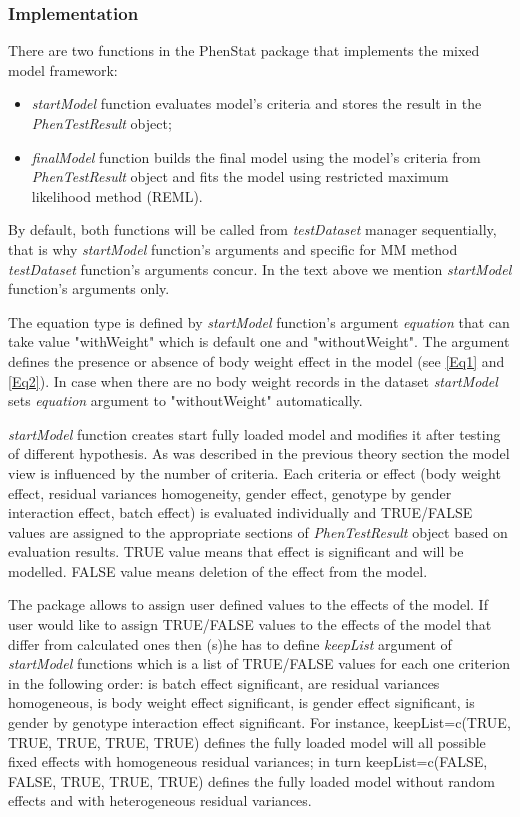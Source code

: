 \documentclass[12pt,a4paper]{article}
\begin{document}
\subsubsection{Implementation}
\label{sec:MMImplementation}
There are two functions in the PhenStat package that implements the mixed model framework:
\begin{itemize}
\item \textit{startModel} function evaluates model's criteria and stores the result in the \textit{PhenTestResult} object;
\item \textit{finalModel} function builds the final model using the model's criteria from \textit{PhenTestResult} object and fits the model using restricted maximum likelihood method (REML). 
\end{itemize}

By default, both functions will be called from \textit{testDataset} manager sequentially, that is why \textit{startModel} function's arguments and specific for MM method \textit{testDataset} function's arguments concur.
In the text above we mention \textit{startModel} function's arguments only. 

The equation type is defined by \textit{startModel} function's argument \textit{equation} that can take value "withWeight" which is default one and "withoutWeight". The argument defines the presence or absence of body weight effect in the model (see \ref{Eq1} and \ref{Eq2}). 
In case when there are no body weight records in the dataset \textit{startModel} sets \textit{equation} argument to "withoutWeight" automatically.

\textit{startModel} function creates start fully loaded model and modifies it after testing of different hypothesis. 
As was described in the previous theory section the model view is influenced by the number of criteria. 
Each criteria or effect (body weight effect, residual variances homogeneity, gender effect, genotype by gender interaction effect, batch effect) is evaluated individually
and TRUE/FALSE values are assigned to the appropriate sections of \textit{PhenTestResult} object based on evaluation results. 
TRUE value means that effect is significant and will be modelled. FALSE value means deletion of the effect from the model.

The package allows to assign user defined values to the effects of the model. 
If user would like to assign TRUE/FALSE values to the effects of the model that differ from calculated ones then (s)he has to define \textit{keepList} argument of \textit{startModel} functions 
which is a list of TRUE/FALSE values for each one criterion in the following order: is batch effect significant, are residual variances homogeneous, is body weight effect significant, 
is gender effect significant, is gender by genotype interaction effect significant. 
For instance, keepList=c(TRUE, TRUE, TRUE, TRUE, TRUE) defines the fully loaded model will all possible fixed effects with homogeneous residual variances; 
in turn keepList=c(FALSE, FALSE, TRUE, TRUE, TRUE) defines the fully loaded model without random effects and with heterogeneous residual variances.
\end{document}
